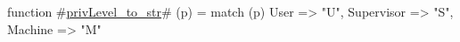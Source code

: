 function #\hyperref[sailRISCVzprivLevelzytozystr]{privLevel\_to\_str}# (p) =
  match (p) {
    User       => "U",
    Supervisor => "S",
    Machine    => "M"
  }
